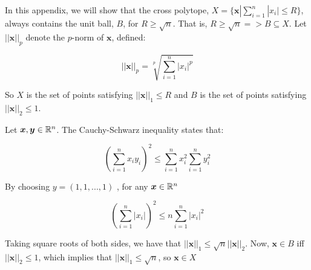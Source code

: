 In this appendix, we will show that the cross polytope, $X = \{{\bm x} | \sum^n_{i=1}|x_i| \leqslant R\}$, always contains the unit ball, $B$, for $R \geqslant \sqrt{n}$. That is, $R \geqslant \sqrt{n} => B \subseteq X$. Let $||{\bm x}||_p$ denote the $p$-norm of ${\bm x}$, defined:

$$
||{\bm x}||_p = \sqrt[p]{\sum^n_{i=1} |x_i|^p}
$$

So $X$ is the set of points satisfying $||{\bm x}||_1 \leqslant R$ and $B$ is the set of points satisfying $||{\bm x}||_2 \leqslant 1$.

Let ${\bm x}, {\bm y} \in \mathbb{R}^n$. The Cauchy-Schwarz inequality states that:

$$
\left(\sum^n_{i=1} x_i y_i\right)^2 \leqslant \sum^n_{i=1} x_i^2 \sum^n_{i=1} y_i^2 
$$

By choosing $y = (1,1,...,1)$ , for any ${\bm x} \in \mathbb{R}^n$

$$
\left(\sum^n_{i=1} |x_i| \right)^2 \leqslant n \sum^n_{i=1} |x_i|^2
$$

Taking square roots of both sides, we have that $||{\bm x}||_1 \leqslant \sqrt{n} ||{\bm x} ||_2$. Now, ${\bm x} \in B$ iff $||{\bm x}||_2 \leqslant 1$, which implies that $||{\bm x}||_1 \leqslant \sqrt{n}$, so ${\bm x} \in X$